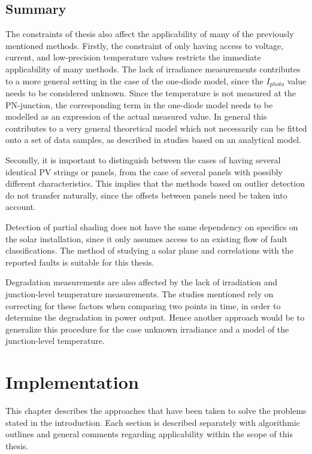 \section{Summary}
The constraints of thesis also affect the applicability of many of the previously mentioned methods.
Firstly, the constraint of only having access to voltage, current, and low-precision temperature values restricts the immediate applicability of many methods.
The lack of irradiance measurements contributes to a more general setting in the case of the one-diode model, since the $I_{photo}$ value needs to be considered unknown.
Since the temperature is not measured at the PN-junction, the corresponding term in the one-diode model needs to be modelled as an expression of the actual measured value.
In general this contributes to a very general theoretical model which not necessarily can be fitted onto a set of data samples, as described in studies based on an analytical model.

Secondly, it is important to distinguish between the cases of having several identical PV strings or panels, from the case of several panels with possibly different characteristics.
This implies that the methods based on outlier detection do not transfer naturally, since the offsets between panels need be taken into account.

Detection of partial shading does not have the same dependency on specifics on the solar installation, since it only assumes access to an existing flow of fault classifications.
The method of studying a solar plane and correlations with the reported faults is suitable for this thesis.

Degradation measurements are also affected by the lack of irradiation and junction-level temperature measurements.
The studies mentioned rely on correcting for these factors when comparing two points in time, in order to determine the degradation in power output.
Hence another approach would be to generalize this procedure for the case unknown irradiance and a model of the junction-level temperature.

\chapter{Implementation}
This chapter describes the approaches that have been taken to solve the problems stated in the introduction.
Each section is described separately with algorithmic outlines and general comments regarding applicability within the scope of this thesis.

